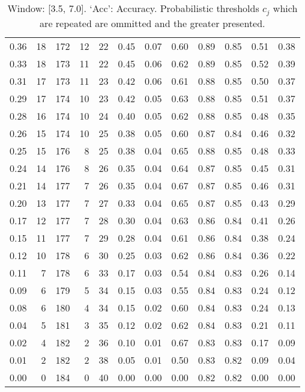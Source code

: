 \begin{table}[ht]
\begin{tabular}{r|rrrrrrrrrrr}
  0.36 & 18 & 172 & 12 & 22 & 0.45 & 0.07 & 0.60 & 0.89 & 0.85 & 0.51 & 0.38 \\ 
  0.33 & 18 & 173 & 11 & 22 & 0.45 & 0.06 & 0.62 & 0.89 & 0.85 & 0.52 & 0.39 \\ 
  0.31 & 17 & 173 & 11 & 23 & 0.42 & 0.06 & 0.61 & 0.88 & 0.85 & 0.50 & 0.37 \\ 
  0.29 & 17 & 174 & 10 & 23 & 0.42 & 0.05 & 0.63 & 0.88 & 0.85 & 0.51 & 0.37 \\ 
  0.28 & 16 & 174 & 10 & 24 & 0.40 & 0.05 & 0.62 & 0.88 & 0.85 & 0.48 & 0.35 \\ 
  0.26 & 15 & 174 & 10 & 25 & 0.38 & 0.05 & 0.60 & 0.87 & 0.84 & 0.46 & 0.32 \\ 
  0.25 & 15 & 176 & 8 & 25 & 0.38 & 0.04 & 0.65 & 0.88 & 0.85 & 0.48 & 0.33 \\ 
  0.24 & 14 & 176 & 8 & 26 & 0.35 & 0.04 & 0.64 & 0.87 & 0.85 & 0.45 & 0.31 \\ 
  0.21 & 14 & 177 & 7 & 26 & 0.35 & 0.04 & 0.67 & 0.87 & 0.85 & 0.46 & 0.31 \\ 
  0.20 & 13 & 177 & 7 & 27 & 0.33 & 0.04 & 0.65 & 0.87 & 0.85 & 0.43 & 0.29 \\ 
  0.17 & 12 & 177 & 7 & 28 & 0.30 & 0.04 & 0.63 & 0.86 & 0.84 & 0.41 & 0.26 \\ 
  0.15 & 11 & 177 & 7 & 29 & 0.28 & 0.04 & 0.61 & 0.86 & 0.84 & 0.38 & 0.24 \\ 
  0.12 & 10 & 178 & 6 & 30 & 0.25 & 0.03 & 0.62 & 0.86 & 0.84 & 0.36 & 0.22 \\ 
  0.11 & 7 & 178 & 6 & 33 & 0.17 & 0.03 & 0.54 & 0.84 & 0.83 & 0.26 & 0.14 \\ 
  0.09 & 6 & 179 & 5 & 34 & 0.15 & 0.03 & 0.55 & 0.84 & 0.83 & 0.24 & 0.12 \\ 
  0.08 & 6 & 180 & 4 & 34 & 0.15 & 0.02 & 0.60 & 0.84 & 0.83 & 0.24 & 0.13 \\ 
  0.04 & 5 & 181 & 3 & 35 & 0.12 & 0.02 & 0.62 & 0.84 & 0.83 & 0.21 & 0.11 \\ 
  0.02 & 4 & 182 & 2 & 36 & 0.10 & 0.01 & 0.67 & 0.83 & 0.83 & 0.17 & 0.09 \\ 
  0.01 & 2 & 182 & 2 & 38 & 0.05 & 0.01 & 0.50 & 0.83 & 0.82 & 0.09 & 0.04 \\ 
  0.00 & 0 & 184 & 0 & 40 & 0.00 & 0.00 & 0.00 & 0.82 & 0.82 & 0.00 & 0.00 \\ 
   \hline
\end{tabular}
\endgroup
\caption{Window: [3.5, 7.0]. `Acc': Accuracy. Probabilistic thresholds $c_j$ which are repeated are ommitted and the greater presented.}
\label{tab:appendix-PBC-ROCs-w2}
\end{table}
